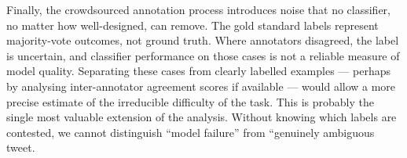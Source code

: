 \documentclass[12pt]{article}
\begin{document}
Finally, the crowdsourced annotation process introduces noise that no classifier, no matter how well-designed, can remove. The gold standard labels represent majority-vote outcomes, not ground truth. Where annotators disagreed, the label is uncertain, and classifier performance on those cases is not a reliable measure of model quality. Separating these cases from clearly labelled examples --- perhaps by analysing inter-annotator agreement scores if available --- would allow a more precise estimate of the irreducible difficulty of the task. This is probably the single most valuable extension of the analysis. Without knowing which labels are contested, we cannot distinguish ``model failure'' from ``genuinely ambiguous tweet.



\nocite{*}




\end{document}
